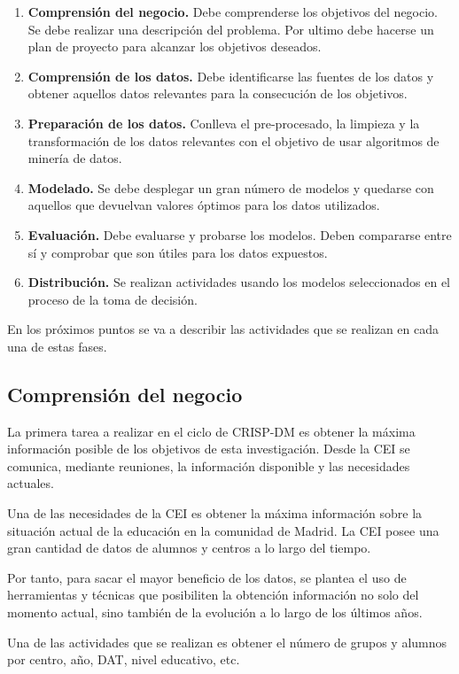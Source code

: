 \begin{enumerate}
	\item \textbf{Comprensión del negocio.} Debe comprenderse los objetivos del negocio. Se debe realizar una descripción del problema. Por ultimo debe hacerse un plan de proyecto para alcanzar los objetivos deseados.
	\item \textbf{Comprensión de los datos.} Debe identificarse las fuentes de los datos y obtener aquellos datos relevantes para la consecución de los objetivos.
	\item \textbf{Preparación de los datos.} Conlleva el pre-procesado, la limpieza y la transformación de los datos relevantes con el objetivo de usar algoritmos de minería de datos.
	\item \textbf{Modelado.} Se debe desplegar un gran número de modelos y quedarse con aquellos que devuelvan valores óptimos para los datos utilizados.
	\item \textbf{Evaluación.} Debe evaluarse y probarse los modelos. Deben compararse entre sí y comprobar que son útiles para los datos expuestos.
	\item \textbf{Distribución.} Se realizan actividades usando los modelos seleccionados en el proceso de la toma de decisión.
\end{enumerate}

En los próximos puntos se va a describir las actividades que se realizan en cada una de estas fases.

\subsection{Comprensión del negocio}
La primera tarea a realizar en el ciclo de CRISP-DM es obtener la máxima información posible de los objetivos de esta investigación. Desde la CEI se comunica, mediante reuniones, la información disponible y las necesidades actuales.

Una de las necesidades de la CEI es obtener la máxima información sobre la situación actual de la educación en la comunidad de Madrid. La CEI posee una gran cantidad de datos de alumnos y centros a lo largo del tiempo. 

Por tanto, para sacar el mayor beneficio de los datos, se plantea el uso de herramientas y técnicas que posibiliten la obtención información no solo del momento actual, sino también de la evolución a lo largo de los últimos años.

Una de las actividades que se realizan es obtener el número de grupos y alumnos por centro, año, DAT, nivel educativo, etc.


